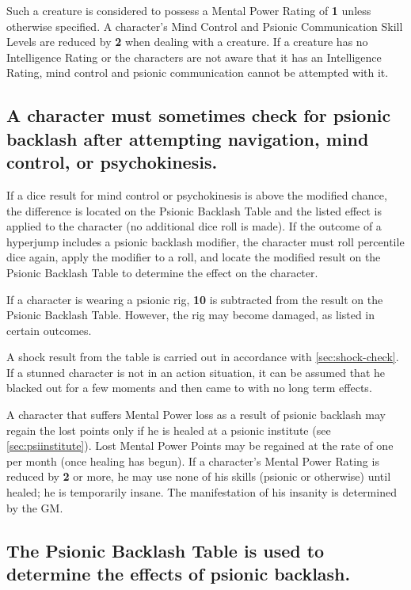 Such a creature is considered to possess a Mental Power Rating of
\textbf{1} unless otherwise specified.  A character's Mind Control and
Psionic Communication Skill Levels are reduced by \textbf{2} when
dealing with a creature.  If a creature has no Intelligence Rating or
the characters are not aware that it has an Intelligence Rating, mind
control and psionic communication cannot be attempted with it.

\subsection[Psionic Backlash]{A character must sometimes check for
  psionic backlash after attempting navigation, mind control, or
  psychokinesis.}
\label{sec:psibacklash}

If a dice result for mind control or psychokinesis is above the
modified chance, the difference is located on the Psionic Backlash
Table and the listed effect is applied to the character (no additional
dice roll is made).  If the outcome of a hyperjump includes a psionic
backlash modifier, the character must roll percentile dice again,
apply the modifier to a roll, and locate the modified result on the
Psionic Backlash Table to determine the effect on the character.

If a character is wearing a psionic rig, \textbf{10} is subtracted
from the result on the Psionic Backlash Table.  However, the rig may
become damaged, as listed in certain outcomes.

A shock result from the
table is carried out in accordance with \ref{sec:shock-check}.  If a stunned
character is not in an action situation, it can be assumed that he
blacked out for a few moments and then came to with no long term
effects.

A character that suffers Mental Power loss as a result of psionic
backlash may regain the lost points only if he is healed at a psionic
institute (see \ref{sec:psiinstitute}).  Lost Mental Power Points may be
regained at the rate of one per month (once healing has begun).  If a
character's Mental Power Rating is reduced by \textbf{2} or more, he
may use none of his skills (psionic or otherwise) until healed; he is
temporarily insane.  The manifestation of his insanity is determined by
the GM.

\subsection[Psionic Backlash table]{The Psionic Backlash Table is
  used to determine the effects of psionic backlash.}  
\label{sec:psibacklashtable}


